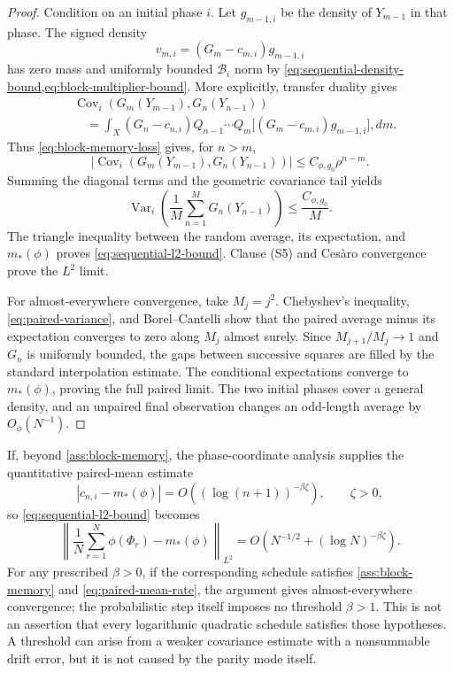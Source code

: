 \documentclass[11pt]{article}
\theoremstyle{definition}
\theoremstyle{remark}
\newcommand{\cB}{\mathcal B}
\newcommand{\Var}{\operatorname{Var}}
\newcommand{\Cov}{\operatorname{Cov}}
\begin{document}
\begin{proof}
Condition on an initial phase $i$.  Let $g_{m-1,i}$ be the density of $Y_{m-1}$ in that phase.  The signed density
\[
    v_{m,i}=(G_m-c_{m,i})g_{m-1,i}
\]
    has zero mass and uniformly bounded $\cB_i$ norm by \cref{eq:sequential-density-bound,eq:block-multiplier-bound}.  More explicitly, transfer duality gives
\begin{align*}
    &\Cov_i(G_m(Y_{m-1}),G_n(Y_{n-1}))\\
    &\quad=\int_X(G_n-c_{n,i})
      Q_{n-1}\cdots Q_m
      \bigl[(G_m-c_{m,i})g_{m-1,i}\bigr],dm.
\end{align*}
Thus \eqref{eq:block-memory-loss} gives, for $n>m$,
\begin{equation}\label{eq:paired-covariance}
    |\Cov_i(G_m(Y_{m-1}),G_n(Y_{n-1}))|
    \le C_{\phi,g_0}\rho^{n-m}.
\end{equation}
Summing the diagonal terms and the geometric covariance tail yields
\begin{equation}\label{eq:paired-variance}
    \Var_i\left(
      \frac1M\sum_{n=1}^M G_n(Y_{n-1})
    \right)
    \le\frac{C_{\phi,g_0}}{M}.
\end{equation}
The triangle inequality between the random average, its expectation, and $m_*(\phi)$ proves \eqref{eq:sequential-l2-bound}.  Clause (S5) and Ces\`aro convergence prove the $L^2$ limit.

For almost-everywhere convergence, take $M_j=j^2$.  Chebyshev's inequality, \eqref{eq:paired-variance}, and Borel--Cantelli show that the paired average minus its expectation converges to zero along $M_j$ almost surely.  Since $M_{j+1}/M_j\to1$ and $G_n$ is uniformly bounded, the gaps between successive squares are filled by the standard interpolation estimate.  The conditional expectations converge to $m_*(\phi)$, proving the full paired limit.  The two initial phases cover a general density, and an unpaired final observation changes an odd-length average by $O_\phi(N^{-1})$.
\end{proof}

If, beyond \cref{ass:block-memory}, the phase-coordinate analysis supplies the quantitative paired-mean estimate
\begin{equation}\label{eq:paired-mean-rate}
    |c_{n,i}-m_*(\phi)|
    =O((\log(n+1))^{-\beta\zeta}),
    \qquad \zeta>0,
\end{equation}
so \eqref{eq:sequential-l2-bound} becomes
\begin{equation}\label{eq:log-birkhoff-rate}
    \left\|
      \frac1N\sum_{r=1}^N\phi(\Phi_r)-m_*(\phi)
    \right\|_{L^2}
    =O\!\left(N^{-1/2}+(\log N)^{-\beta\zeta}\right).
\end{equation}
For any prescribed $\beta>0$, if the corresponding schedule satisfies \cref{ass:block-memory} and \eqref{eq:paired-mean-rate}, the argument gives almost-everywhere convergence; the probabilistic step itself imposes no threshold $\beta>1$.  This is not an assertion that every logarithmic quadratic schedule satisfies those hypotheses.  A threshold can arise from a weaker covariance estimate with a nonsummable drift error, but it is not caused by the parity mode itself.
\end{document}
